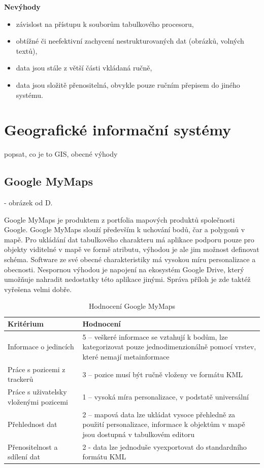 \textbf{Nevýhody}

\begin{itemize}
	\item závislost na přístupu k souborům tabulkového procesoru,
	\item obtížné či neefektivní zachycení nestrukturovaných dat (obrázků, volných textů),
	\item data jsou stále z větší části vkládaná ručně,
	\item data jsou složitě přenositelná, obvykle pouze ručním přepisem do jiného systému.
\end{itemize}

\section{Geografické informační systémy}

popsat, co je to GIS, obecné výhody

\subsection{Google MyMaps}

- obrázek od D.

Google MyMaps je produktem z portfolia mapových produktů společnosti Google. Google MyMaps slouží především k uchování bodů, čar a polygonů v mapě. Pro ukládání dat tabulkového charakteru má aplikace podporu pouze pro objekty viditelné v mapě ve formě atributu, výhodou je ale jim možnost definovat schéma. Software ze své obecné charakteristiky má vysokou míru personalizace a obecnosti. Nespornou výhodou je napojení na ekosystém Google Drive, který umožňuje nahradit nedostatky této aplikace jinými. Správa příloh je zde taktéž vyřešena velmi dobře.

\begin{table}[h]
	\begin{tabular}{ l | l }
		Kritérium                              & Hodnocení \\
		\hline			
		Informace o jedincích                  & 5 -- veškeré informace se vztahují k bodům, lze kategorizovat pouze jednodimenzionálně pomocí vrstev, které nemají metainformace          \\
		Práce s pozicemi z trackerů            & 3 -- pozice musí být ručně vloženy ve formátu KML          \\
		Práce s uživatelsky vloženými pozicemi & 1 -- vysoká míra personalizace, v podstatě universální          \\
		Přehlednost dat                        & 2 -- mapová data lze ukládat vysoce přehledně za použití personalizace, informace k objektům v mapě jsou dostupná v tabulkovém editoru          \\
		Přenositelnost a sdílení dat           & 2 - data lze jednoduše vyexportovat do standardního formátu KML          \\
		\hline	
	\end{tabular}
	\caption{Hodnocení Google MyMaps}
\end{table}

